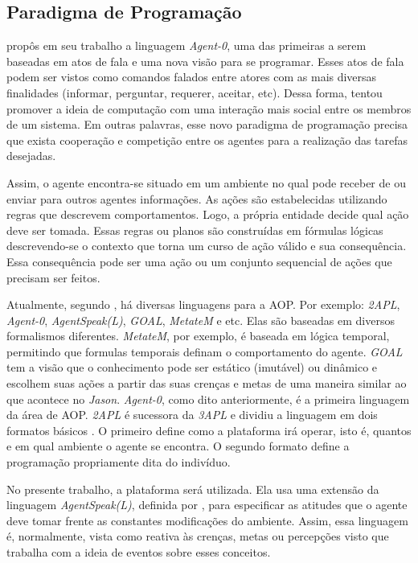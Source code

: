 \subsection{Paradigma de Programação} \label{sec:aoppp}

\citet{shoham1993agent} propôs em seu trabalho a linguagem \emph{Agent-0}, uma
das primeiras a serem baseadas em atos de fala e uma nova visão para se
programar.  Esses atos de fala podem ser vistos como comandos falados entre
atores com as mais diversas finalidades (informar, perguntar, requerer,
aceitar, etc).  Dessa forma,  tentou promover a
ideia de computação com uma interação mais social entre os membros de um sistema.
Em outras palavras, esse novo paradigma de programação precisa que exista
cooperação e competição entre os agentes para a realização das tarefas
desejadas.

Assim, o agente encontra-se situado em um ambiente no qual pode receber de ou
enviar para outros agentes informações. As ações são
estabelecidas utilizando regras que descrevem comportamentos. Logo, 
a própria entidade decide qual ação deve ser tomada. Essas regras ou
planos\label{plan}
são construídas em fórmulas lógicas descrevendo-se o contexto que torna um
curso de ação válido e sua consequência. Essa consequência pode ser uma ação
ou um conjunto sequencial de ações que precisam ser feitos.

Atualmente, segundo \citet{bordini2009multi}, há diversas linguagens para a
AOP. Por exemplo: \emph{2APL}, \emph{Agent-0}, \emph{AgentSpeak(L)},
\emph{GOAL}, \emph{MetateM} e etc. Elas são baseadas em diversos
formalismos diferentes. \emph{MetateM}, por exemplo, é baseada em lógica temporal,
permitindo que formulas temporais definam o comportamento do agente.
\emph{GOAL} tem a visão que o conhecimento pode ser estático (imutável) ou
dinâmico e escolhem suas ações a partir das suas crenças e metas de uma
maneira similar ao que acontece no \emph{Jason}.
\emph{Agent-0}, como dito anteriormente, é a primeira linguagem da
área de AOP. \emph{2APL} é sucessora da \emph{3APL} e dividiu a linguagem em
dois formatos básicos \cite{dastani20082apl}. O primeiro define como a
plataforma irá operar, isto é, quantos e em qual ambiente o agente se
encontra. O segundo formato define a programação propriamente dita do indivíduo.

No presente trabalho, a plataforma \jason \cite{bordini-jason} será utilizada.
Ela usa uma extensão da linguagem \emph{AgentSpeak(L)}, definida por
\citet{rao1996agentspeak}, para especificar as atitudes que o agente deve
tomar frente as constantes modificações do ambiente. Assim, essa linguagem é,
normalmente, vista como reativa às crenças, metas ou percepções visto que
trabalha com a ideia de eventos sobre esses conceitos.

